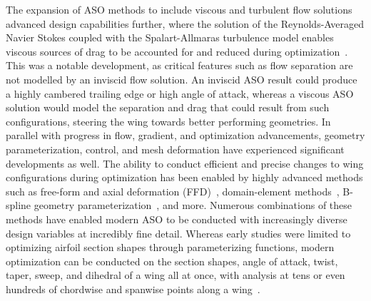 The expansion of ASO methods to include viscous and turbulent flow solutions advanced design capabilities further, where the solution of the Reynolds-Averaged Navier Stokes coupled with the Spalart-Allmaras turbulence model enables viscous sources of drag to be accounted for and reduced during optimization~\cite{jameson_optimum_1998,nielsen_aerodynamic_1999}. 
This was a notable development, as critical features such as flow separation are not modelled by an inviscid flow solution. An inviscid ASO result could produce a highly cambered trailing edge or high angle of attack, whereas a viscous ASO solution would model the separation and drag that could result from such configurations, steering the wing towards better performing geometries.
In parallel with progress in flow, gradient, and optimization advancements, geometry parameterization, control, and mesh deformation have experienced significant developments as well.
The ability to conduct efficient and precise changes to wing configurations during optimization has been enabled by highly advanced methods such as free-form and axial deformation (FFD)~\cite{gagnon_two-level_2015}, domain-element methods~\cite{morris_domain-element_2009}, B-spline geometry parameterization~\cite{yu_application_1995}, and more.
Numerous combinations of these methods have enabled modern ASO to be conducted with increasingly diverse design variables at incredibly fine detail.
Whereas early studies were limited to optimizing airfoil section shapes through parameterizing functions, modern optimization can be conducted on the section shapes, angle of attack, twist, taper, sweep, and dihedral of a wing all at once, with analysis at tens or even hundreds of chordwise and spanwise points along a wing~\cite{lyu_benchmarking_2014, zingg_aerodynamic_2017, streuber_evaluating_2021, reist_aerodynamic_2013, reist_optimization_2015, reist_aerodynamic_2016, kuntawala_preliminary_2011}. \par

